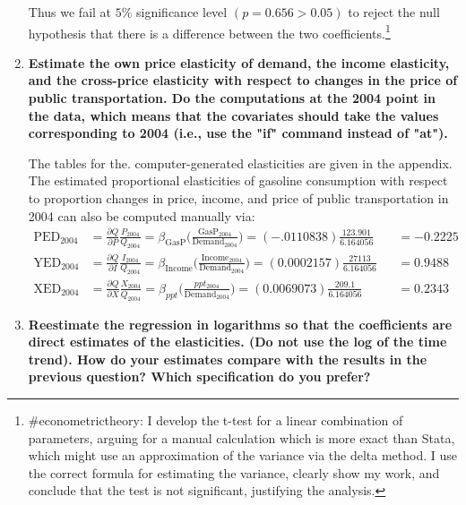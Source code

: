 \documentclass{article}
\begin{document}
\begin{enumerate}[label=\alph*.]
Thus we fail  at $5\%$ significance level $(p = 0.656 > 0.05)$ to reject the null hypothesis that there is a difference between the two coefficients.\footnote{\#econometrictheory: I develop the t-test for a linear combination of parameters, arguing for a manual calculation which is more exact than Stata, which might use an approximation of the variance via the delta method. I use the correct formula for estimating the variance, clearly show my work, and conclude that the test is not significant, justifying the analysis.} 



\item \textbf{Estimate the own price elasticity of demand, the income elasticity, and the cross-price elasticity with respect to changes in the price of public transportation. Do the computations at the 2004 point in the data, which means that the covariates should take the values corresponding to 2004 (i.e., use the "if" command instead of "at").}

The tables for the. computer-generated elasticities are given in the appendix. The estimated proportional elasticities of gasoline consumption  with respect to proportion changes in price, income, and price of public transportation in 2004 can also be computed manually via:
\begin{align*}
\text{PED}_{2004} &= \frac{\partial Q}{\partial P}\frac{P_{2004}}{Q_{2004}} = \beta_{\text{GasP}} \Big( \frac{\text{GasP}_{2004}}{\text{Demand}_{2004}} \Big)   = (-.0110838)\frac{123.901}{6.164056} &&= -0.2225 \\
\text{YED}_{2004} &= \frac{\partial Q}{ \partial I}\frac{I_{2004}}{Q_{2004}} = \beta_{\text{Income}} \Big( \frac{\text{Income}_{2004}} {\text{Demand}_{2004}} \Big) =(0.0002157)\frac{27113}{6.164056} &&= 0.9488 \\
\text{XED}_{2004} &= \frac{\partial Q}{ \partial X} \frac{X_{2004}}{Q_{2004}} = \beta_{ppt} \Big( \frac{ppt_{2004}}{\text{Demand}_{2004}} \Big) =  (	0.0069073) \frac{209.1}{6.164056} &&= 0.2343
\end{align*}




\item \textbf{Reestimate the regression in logarithms so that the coefficients are direct estimates of the elasticities. (Do not use the log of the time trend). How do your estimates compare with the results in the previous question? Which specification do you prefer?}


\end{enumerate}
\end{document}
